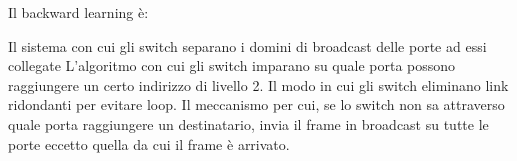 \question
Il backward learning è:

\begin{checkboxes}
	\choice Il sistema con cui gli switch separano i domini di broadcast delle porte ad essi collegate
	\CorrectChoice L'algoritmo con cui gli switch imparano su quale porta possono raggiungere un certo indirizzo di livello 2.
	\choice Il modo in cui gli switch eliminano link ridondanti per evitare loop.
	\choice Il meccanismo per cui, se lo switch non sa attraverso quale porta raggiungere un destinatario, invia il frame in broadcast su tutte le porte eccetto quella da cui il frame è arrivato.
\end{checkboxes}

